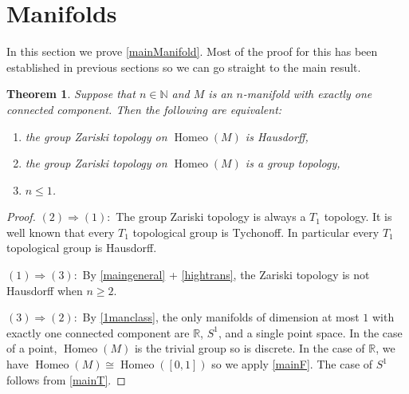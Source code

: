 \documentclass[11pt]{amsart}
\newtheorem{theorem}{Theorem}[section]
\newcommand{\N}{\mathbb N}
\begin{document}
\section{Manifolds}

In this section we prove \cref{mainManifold}. Most of the proof for this has been established in previous sections so we can go straight to the main result.

\begin{theorem}
    Suppose that \(n\in \N\) and \(M\) is an \(n\)-manifold with exactly one connected component. Then the following are equivalent:
    \begin{enumerate}
        \item the group Zariski topology on \(\operatorname{Homeo}(M)\) is Hausdorff,
        \item the group Zariski topology on \(\operatorname{Homeo}(M)\) is a group topology,
        \item \(n\leq 1\).
    \end{enumerate}
\end{theorem}
\begin{proof}
    \((2)\Rightarrow (1):\) The group Zariski topology is always a \(T_1\) topology.
    It is well known that every \(T_1\) topological group is Tychonoff. In particular every \(T_1\) topological group is Hausdorff.

    
\((1)\Rightarrow (3):\) 
By \cref{maingeneral} + \cref{hightrans}, the Zariski topology is not Hausdorff when \(n\geq 2\).

\((3)\Rightarrow (2):\)
By \cref{1manclass}, the only manifolds of dimension at most \(1\) with exactly one connected component are \(\mathbb{R}\), \(S^1\), and a single point space.
In the case of a point, \(\operatorname{Homeo}(M)\) is the trivial group so is discrete.
In the case of \(\mathbb{R}\), we have \(\operatorname{Homeo}(M)\cong \operatorname{Homeo}([0, 1])\) so we apply \cref{mainF}.
The case of \(S^1\) follows from \cref{mainT}.
\end{proof}
\end{document}
